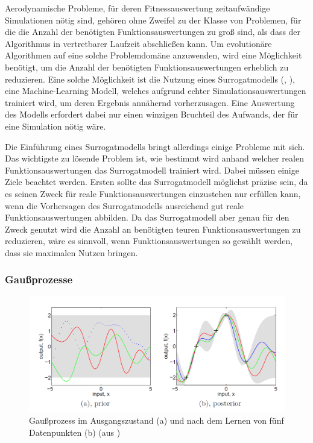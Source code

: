 Aerodynamische Probleme, für deren Fitnessauswertung zeitaufwändige Simulationen nötig sind, gehören ohne Zweifel zu der Klasse von Problemen, für die die Anzahl der benötigten Funktionsauswertungen zu groß sind, als dass der Algorithmus in vertretbarer Laufzeit abschließen kann.
Um evolutionäre Algorithmen auf eine solche Problemdomäne anzuwenden, wird eine Möglichkeit benötigt, um die Anzahl der benötigten Funktionsauswertungen erheblich zu reduzieren.
Eine solche Möglichkeit ist die Nutzung eines Surrogatmodells (\cite{Jin.2011}, \cite{Preen.2016}), eine Machine-Learning Modell, welches aufgrund echter Simulationsauswertungen trainiert wird, um deren Ergebnis annähernd vorherzusagen.
Eine Auswertung des Modells erfordert dabei nur einen winzigen Bruchteil des Aufwands, der für eine Simulation nötig wäre.

Die Einführung eines Surrogatmodells bringt allerdings einige Probleme mit sich.
Das wichtigste zu lösende Problem ist, wie bestimmt wird anhand welcher realen Funktionsauswertungen das Surrogatmodell trainiert wird.
Dabei müssen einige Ziele beachtet werden.
Ersten sollte das Surrogatmodell möglichst präzise sein, da es seinen Zweck für reale Funktionsauswertungen einzustehen nur erfüllen kann, wenn die Vorhersagen des Surrogatmodells ausreichend gut reale Funktionsauswertungen abbilden.
Da das Surrogatmodell aber genau für den Zweck genutzt wird die Anzahl an benötigten teuren Funktionsauswertungen zu reduzieren, wäre es sinnvoll, wenn Funktionsauswertungen so gewählt werden, dass sie maximalen Nutzen bringen.


\subsubsection{Gaußprozesse}
\label{sub:gp}
\begin{figure}[h]
	\centering
	\includegraphics[width=1\linewidth]{bilder/gp}
	\caption{Gaußprozess im Ausgangszustand (a) und nach dem Lernen von fünf Datenpunkten (b) (aus \cite{Rasmussen.2008})}
	\label{fig:gp}
\end{figure}

